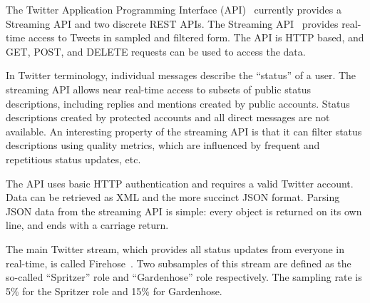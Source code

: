 The Twitter Application Programming Interface (API)~\cite{api}
currently provides a Streaming API and two discrete REST APIs. The
Streaming API~\cite{streaming-api} provides real-time access to Tweets
in sampled and filtered form. The API is HTTP based, and GET, POST,
and DELETE requests can be used to access the data.

In Twitter terminology, individual messages describe the ``status'' of
a user. The streaming API allows near real-time access to subsets of
public status descriptions, including replies and mentions created by
public accounts.  Status descriptions created by protected accounts
and all direct messages are not available.  An interesting property of
the streaming API is that it can filter status descriptions using
quality metrics, which are influenced by frequent and repetitious
status updates, etc.

The API uses basic HTTP authentication and requires a valid Twitter
account.  Data can be retrieved as XML and the more succinct JSON
format. Parsing JSON data from the streaming API is simple: every
object is returned on its own line, and ends with a carriage return.

\BEGINOMIT
The main Twitter stream, which provides all status updates from
everyone in real-time, is called Firehose~\cite{streaming-api}. Two subsamples of this
stream are defined as the so-called ``Spritzer'' role and
``Gardenhose'' role respectively. The sampling rate is 5\% for the
Spritzer role and 15\% for Gardenhose. 
\ENDOMIT

